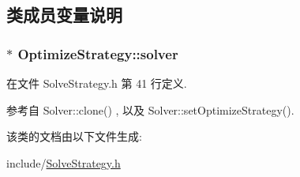 \subsection{类成员变量说明}
\subsubsection[{\texorpdfstring{solver}{solver}}]{$\ast$ Optimize\+Strategy\+::solver}\hypertarget{classOptimizeStrategy_a3954aa31d0f832b79a52648ef295b379}{}\label{classOptimizeStrategy_a3954aa31d0f832b79a52648ef295b379}


在文件 Solve\+Strategy.\+h 第 41 行定义.



参考自 Solver\+::clone() , 以及 Solver\+::set\+Optimize\+Strategy().



该类的文档由以下文件生成\+:\begin{DoxyCompactItemize}
\item 
include/\hyperlink{SolveStrategy_8h}{Solve\+Strategy.\+h}\end{DoxyCompactItemize}
